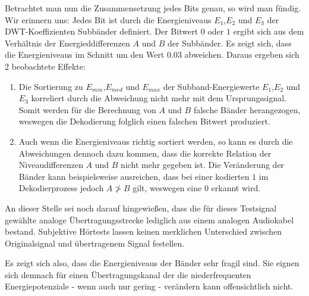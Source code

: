 Betrachtet man nun die Zusammensetzung jedes Bits genau, so wird man fündig. Wir erinnern uns: Jedes Bit ist durch die Energieniveaus ${E}_{1}$,${E}_{2}$ und ${E}_{3}$ der DWT-Koeffizienten Subbänder definiert. Der Bitwert $0$ oder $1$ ergibt sich aus dem Verhältnis der Energieddifferenzen $A$ und $B$ der Subbänder. Es zeigt sich, dass die Energieniveaus im Schnitt um den Wert $0.03$ abweichen. Daraus ergeben sich 2 beobachtete Effekte:

\begin{enumerate}
		
\item Die Sortierung zu ${E}_{min}$,${E}_{med}$ und ${E}_{max}$ der Subband-Energiewerte ${E}_{1}$,${E}_{2}$ und ${E}_{3}$ korreliert durch die Abweichung nicht mehr mit dem Ursprungssignal. Somit werden für die Berechnung von $A$ und $B$ falsche Bänder herangezogen, weswegen die Dekodierung folglich einen falschen Bitwert produziert. 
	
\item Auch wenn die Energieniveaus richtig sortiert werden, so kann es durch die Abweichungen dennoch dazu kommen, dass die korrekte Relation der Niveaudifferenzen $A$ und $B$ nicht mehr gegeben ist. Die Veränderung der Bänder kann beispielsweise ausreichen, dass bei einer kodierten $1$ im Dekodierprozess jedoch $A \ngtr B$ gilt, weswegen eine $0$ erkannt wird.
	
\end{enumerate}

An dieser Stelle sei noch darauf hingewießen, dass die für dieses Testsignal gewählte analoge Übertragungsstrecke lediglich aus einem analogen Audiokabel bestand. Subjektive Hörtests lassen keinen merklichen Unterschied zwischen Originalsignal und übertragenem Signal festellen. 

Es zeigt sich also, dass die Energieniveaus der Bänder sehr fragil sind. Sie eignen sich demnach für einen Übertragungskanal der die niederfrequenten Energiepotenziale - wenn auch nur gering - verändern kann offensichtlich nicht. 